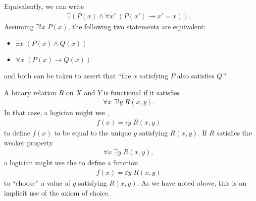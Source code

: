 \documentclass[letterpaper,10pt,english]{sphinxmanual}
\begin{document}
\sphinxAtStartPar
Equivalently, we can write
\begin{equation*}
\begin{split}\exists (P(x) \wedge \forall x' \; (P(x') \to x' = x)).\end{split}
\end{equation*}
\sphinxAtStartPar
Assuming \(\exists! x \; P(x)\), the following two statements are equivalent:
\begin{itemize}
\item {} 
\sphinxAtStartPar
\(\exists x \; (P(x) \wedge Q(x))\)

\item {} 
\sphinxAtStartPar
\(\forall x \; (P(x) \to Q(x))\)

\end{itemize}

\sphinxAtStartPar
and both can be taken to assert that “the \(x\) satisfying \(P\) also satisfies \(Q\).”

\sphinxAtStartPar
A binary relation \(R\) on \(X\) and \(Y\) is functional if it satisfies
\begin{equation*}
\begin{split}\forall x \; \exists! y \; R(x,y).\end{split}
\end{equation*}
\sphinxAtStartPar
In that case, a logician might use ,
\begin{equation*}
\begin{split}f(x) = \iota y \; R(x, y)\end{split}
\end{equation*}
\sphinxAtStartPar
to define \(f(x)\) to be equal to the unique \(y\) satisfying \(R(x,y)\). If \(R\) satisfies the weaker property
\begin{equation*}
\begin{split}\forall x \; \exists y \; R(x,y),\end{split}
\end{equation*}
\sphinxAtStartPar
a logician might use the  to define a function
\begin{equation*}
\begin{split}f(x) = \varepsilon y \; R(x, y)\end{split}
\end{equation*}
\sphinxAtStartPar
to “choose” a value of \(y\) satisfying \(R(x, y)\). As we have noted above, this is an implicit use of the axiom of choice.
\end{document}
